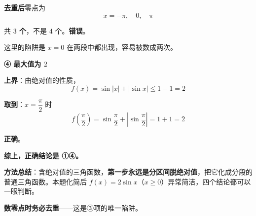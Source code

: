 \begin{answer}
\textbf{去重后}零点为
\nopagebreak[4]
\[x=-\pi,\quad 0,\quad \pi\]

共 \textbf{$3$ 个}，不是 $4$ 个。\textbf{错误}。

\begin{gktip}
这里的陷阱是 $x=0$ 在两段中都出现，容易被数成两次。
\end{gktip}

\par\medskip

\textbf{④ 最大值为 $2$ }

\textbf{上界}：由绝对值的性质，
\nopagebreak[4]
\[f(x)=\sin|x|+|\sin x|\le1+1=2\]

\textbf{取到}：$x=\dfrac\pi2$ 时
\nopagebreak[4]
\[f\left(\frac\pi2\right)=\sin\frac\pi2+\left|\sin\frac\pi2\right|=1+1=2\]

\textbf{正确}。

\textbf{综上，正确结论是 ①④。}

\begin{gktip}
\textbf{方法总结}：含绝对值的三角函数，\textbf{第一步永远是分区间脱绝对值}，把它化成分段的普通三角函数。本题化简后 $f(x)=2\sin x$（$x\ge0$）异常简洁，四个结论都可以一眼判断。

\textbf{数零点时务必去重}——这是③项的唯一陷阱。
\end{gktip}


\par\medskip

\end{answer}
